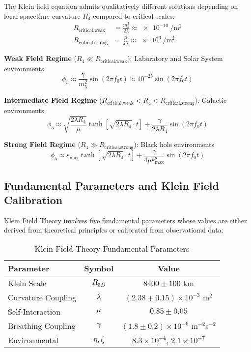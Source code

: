 \documentclass[aps,prl,twocolumn,showpacs,superscriptaddress,groupedaddress]{revtex4-1}
\newcommand{\phifive}{\phi_5}
\newcommand{\epsmax}{\varepsilon_{\text{max}}}
\newcommand{\fzero}{f_0}
\newcommand{\Rfive}{R_{5D}}
\newcommand{\Rfour}{R_4}
\begin{document}
The Klein field equation admits qualitatively different solutions depending on local spacetime curvature $\Rfour$ compared to critical scales:
\begin{align}
R_{\text{critical,weak}} &= \frac{m_5^2}{2\lambda} \approx \SI{e-10}{\per\meter\squared} \\
R_{\text{critical,strong}} &= \frac{\mu}{2\lambda} \approx \SI{e6}{\per\meter\squared}
\end{align}

\textbf{Weak Field Regime} ($\Rfour \ll R_{\text{critical,weak}}$): Laboratory and Solar System environments
\begin{equation}
\phifive \approx \frac{\gamma}{m_5^2} \sin(2\pi\fzero t) \approx 10^{-25} \sin(2\pi\fzero t)
\end{equation}

\textbf{Intermediate Field Regime} ($R_{\text{critical,weak}} < \Rfour < R_{\text{critical,strong}}$): Galactic environments
\begin{equation}
\phifive \approx \sqrt{\frac{2\lambda\Rfour}{\mu}} \tanh[\sqrt{2\lambda\Rfour} \cdot t] + \frac{\gamma}{2\lambda\Rfour} \sin(2\pi\fzero t)
\end{equation}

\textbf{Strong Field Regime} ($\Rfour \gg R_{\text{critical,strong}}$): Black hole environments
\begin{equation}
\phifive \approx \epsmax \tanh[\sqrt{2\lambda\Rfour} \cdot t] + \frac{\gamma}{4\mu\epsmax^2} \sin(2\pi\fzero t)
\end{equation}

\subsection{Fundamental Parameters and Klein Field Calibration}

Klein Field Theory involves five fundamental parameters whose values are either derived from theoretical principles or calibrated from observational data:

\begin{table}[ht]
\caption{\label{tab:parameters}Klein Field Theory Fundamental Parameters}
\begin{ruledtabular}
\begin{tabular}{lcc}
Parameter & Symbol & Value \\
\hline
Klein Scale & $\Rfive$ & $8400 \pm 100$ km \\
Curvature Coupling & $\lambda$ & $(2.38 \pm 0.15) \times 10^{-3}$ m$^2$ \\
Self-Interaction & $\mu$ & $0.85 \pm 0.05$ \\
Breathing Coupling & $\gamma$ & $(1.8 \pm 0.2) \times 10^{-6}$ m$^{-2}$s$^{-2}$ \\
Environmental & $\eta, \zeta$ & $8.3 \times 10^{-4}$, $2.1 \times 10^{-7}$ \\
\end{tabular}
\end{ruledtabular}
\end{table}
\end{document}

